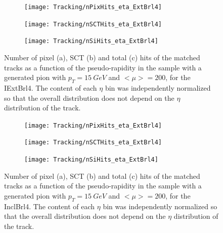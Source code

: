 \documentclass[a4paper,twoside,12pt]{article}
\begin{document}
\begin{figure}
\begin{subfigure}{\linewidth}
\centering
\texttt{[image: Tracking/nPixHits\_eta\_ExtBrl4]}
\caption{}
\label{fig:tracking:nPixHits_eta_IExtBrl4}
\end{subfigure}

\begin{subfigure}{\linewidth}
\centering
\texttt{[image: Tracking/nSCTHits\_eta\_ExtBrl4]}
\caption{}
\label{fig:tracking:nSCTHits_eta_IExtBrl4}
\end{subfigure}

\begin{subfigure}{\linewidth}
\centering
\texttt{[image: Tracking/nSiHits\_eta\_ExtBrl4]}
\caption{}
\label{fig:tracking:nSiHits_eta_IExtBrl4}
\end{subfigure}
\caption{Number of pixel (a), SCT (b) and total (c) hits of the matched tracks as a function of the pseudo-rapidity in the sample with a generated pion with $p_{T} = 15\ GeV$ and $<\mu> = 200$, for the IExtBrl4. The content of each $\eta$ bin was independently normalized so that the overall distribution does not depend on the $\eta$ distribution of the track.}
\label{fig:tracking:nHits_eta_IExtBrl4}
\end{figure}

\begin{figure}
\begin{subfigure}{\linewidth}
\centering
\texttt{[image: Tracking/nPixHits\_eta\_ExtBrl4]}
\caption{}
\label{fig:tracking:nPixHits_eta_InclBrl4}
\end{subfigure}

\begin{subfigure}{\linewidth}
\centering
\texttt{[image: Tracking/nSCTHits\_eta\_ExtBrl4]}
\caption{}
\label{fig:tracking:nSCTHits_eta_InclBrl4}
\end{subfigure}

\begin{subfigure}{\linewidth}
\centering
\texttt{[image: Tracking/nSiHits\_eta\_ExtBrl4]}
\caption{}
\label{fig:tracking:nSiHits_eta_InclBrl4}
\end{subfigure}
\caption{Number of pixel (a), SCT (b) and total (c) hits of the matched tracks as a function of the pseudo-rapidity in the sample with a generated pion with $p_{T} = 15\ GeV$ and $<\mu> = 200$, for the InclBrl4. The content of each $\eta$ bin was independently normalized so that the overall distribution does not depend on the $\eta$ distribution of the track.}
\label{fig:tracking:nHits_eta_InclBrl4}
\end{figure}
\end{document}

